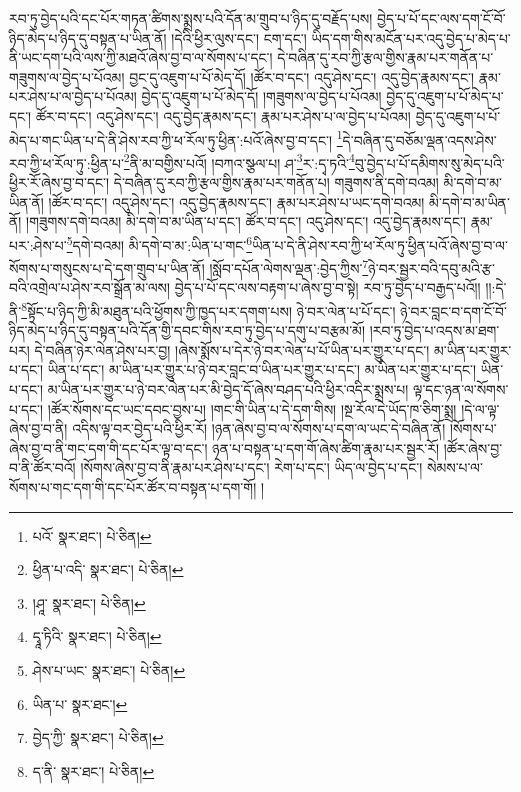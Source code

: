 རབ་ཏུ་བྱེད་པའི་དང་པོར་གཏན་ཚིགས་སྨྲས་པའི་དོན་མ་གྲུབ་པ་ཉིད་དུ་བརྗོད་པས། བྱེད་པ་པོ་དང་ལས་དག་ངོ་བོ་ཉིད་མེད་པ་ཉིད་དུ་བསྟན་པ་ཡིན་ནོ། །དེའི་ཕྱིར་ལུས་དང་། ངག་དང་། ཡིད་དག་གིས་མངོན་པར་འདུ་བྱེད་པ་མེད་པ་ནི་ཡང་དག་པའི་ལས་ཀྱི་མཐའོ་ཞེས་བྱ་བ་ལ་སོགས་པ་དང་། དེ་བཞིན་དུ་རབ་ཀྱི་རྩལ་གྱིས་རྣམ་པར་གནོན་པ་གཟུགས་ལ་བྱེད་པ་པོའམ། བྱང་དུ་འཇུག་པ་པོ་མེད་དོ། །ཚོར་བ་དང་། འདུ་ཤེས་དང་། འདུ་བྱེད་རྣམས་དང་། རྣམ་པར་ཤེས་པ་ལ་བྱེད་པ་པོའམ། བྱེད་དུ་འཇུག་པ་པོ་མེད་དོ། །གཟུགས་ལ་བྱེད་པ་པོའམ། བྱེད་དུ་འཇུག་པ་པོ་མེད་པ་དང་། ཚོར་བ་དང་། འདུ་ཤེས་དང་། འདུ་བྱེད་རྣམས་དང་། རྣམ་པར་ཤེས་པ་ལ་བྱེད་པ་པོའམ། བྱེད་དུ་འཇུག་པ་པོ་མེད་པ་གང་ཡིན་པ་དེ་ནི་ཤེས་རབ་ཀྱི་ཕ་རོལ་ཏུ་ཕྱིན་:པའོ་ཞེས་བྱ་བ་དང་། \footnote{པའོ་  སྣར་ཐང་།  པེ་ཅིན། }དེ་བཞིན་དུ་བཅོམ་ལྡན་འདས་ཤེས་རབ་ཀྱི་ཕ་རོལ་ཏུ་:ཕྱིན་པ་\footnote{ཕྱིན་པ་འདི་  སྣར་ཐང་།  པེ་ཅིན། }ནི་མ་བགྱིས་པའོ། །བཀའ་སྩལ་པ། ཤ་\footnote{།ཤཱ་  སྣར་ཐང་།  པེ་ཅིན། }ར་:དྭ་ཏའི་\footnote{དྭཱ་ཏིའི་  སྣར་ཐང་།  པེ་ཅིན། }བུ་བྱེད་པ་པོ་དམིགས་སུ་མེད་པའི་ཕྱིར་རོ་ཞེས་བྱ་བ་དང་། དེ་བཞིན་དུ་རབ་ཀྱི་རྩལ་གྱིས་རྣམ་པར་གནོན་པ། གཟུགས་ནི་དགེ་བའམ། མི་དགེ་བ་མ་ཡིན་ནོ། །ཚོར་བ་དང་། འདུ་ཤེས་དང་། འདུ་བྱེད་རྣམས་དང་། རྣམ་པར་ཤེས་པ་ཡང་དགེ་བའམ། མི་དགེ་བ་མ་ཡིན་ནོ། །གཟུགས་དགེ་བའམ། མི་དགེ་བ་མ་ཡིན་པ་དང་། ཚོར་བ་དང་། འདུ་ཤེས་དང་། འདུ་བྱེད་རྣམས་དང་། རྣམ་པར་:ཤེས་པ་\footnote{ཤེས་པ་ཡང་  སྣར་ཐང་།  པེ་ཅིན། }དགེ་བའམ། མི་དགེ་བ་མ་:ཡིན་པ་གང་\footnote{ཡིན་པ་  སྣར་ཐང་། }ཡིན་པ་དེ་ནི་ཤེས་རབ་ཀྱི་ཕ་རོལ་ཏུ་ཕྱིན་པའོ་ཞེས་བྱ་བ་ལ་སོགས་པ་གསུངས་པ་དེ་དག་གྲུབ་པ་ཡིན་ནོ། །སློབ་དཔོན་ལེགས་ལྡན་:བྱེད་ཀྱིས་\footnote{བྱེད་ཀྱི་  སྣར་ཐང་།  པེ་ཅིན། }ཉེ་བར་སྦྱར་བའི་དབུ་མའི་རྩ་བའི་འགྲེལ་པ་ཤེས་རབ་སྒྲོན་མ་ལས། བྱེད་པ་པོ་དང་ལས་བརྟག་པ་ཞེས་བྱ་བ་སྟེ། རབ་ཏུ་བྱེད་པ་བརྒྱད་པའོ།། །།:དེ་ནི་\footnote{ད་ནི་  སྣར་ཐང་།  པེ་ཅིན། }སྟོང་པ་ཉིད་ཀྱི་མི་མཐུན་པའི་ཕྱོགས་ཀྱི་ཁྱད་པར་དགག་པས། ཉེ་བར་ལེན་པ་པོ་དང་། ཉེ་བར་བླང་བ་དག་ངོ་བོ་ཉིད་མེད་པ་ཉིད་དུ་བསྟན་པའི་དོན་གྱི་དབང་གིས་རབ་ཏུ་བྱེད་པ་དགུ་པ་བརྩམ་མོ། །རབ་ཏུ་བྱེད་པ་འདས་མ་ཐག་པར། དེ་བཞིན་ཉེར་ལེན་ཤེས་པར་བྱ། །ཞེས་སྨོས་པ་དེར་ཉེ་བར་ལེན་པ་པོ་ཡིན་པར་གྱུར་པ་དང་། མ་ཡིན་པར་གྱུར་པ་དང་། ཡིན་པ་དང་། མ་ཡིན་པར་གྱུར་པ་ཉེ་བར་བླང་བ་ཡིན་པར་གྱུར་པ་དང་། མ་ཡིན་པར་གྱུར་པ་དང་། ཡིན་པ་དང་། མ་ཡིན་པར་གྱུར་པ་ཉེ་བར་ལེན་པར་མི་བྱེད་དོ་ཞེས་བཤད་པའི་ཕྱིར་འདིར་སྨྲས་པ། ལྟ་དང་ཉན་ལ་སོགས་པ་དང་། །ཚོར་སོགས་དང་ཡང་དབང་བྱས་པ། །གང་གི་ཡིན་པ་དེ་དག་གིས། །སྔ་རོལ་དེ་ཡོད་ཁ་ཅིག་སྨྲ། །དེ་ལ་ལྟ་ཞེས་བྱ་བ་ནི། འདིས་ལྟ་བར་བྱེད་པའི་ཕྱིར་རོ། །ཉན་ཞེས་བྱ་བ་ལ་སོགས་པ་དག་ལ་ཡང་དེ་བཞིན་ནོ། །སོགས་པ་ཞེས་བྱ་བ་ནི་གང་དག་གི་དང་པོར་ལྟ་བ་དང་། ཉན་པ་བསྟན་པ་དག་གོ་ཞེས་ཚིག་རྣམ་པར་སྦྱར་རོ། །ཚོར་ཞེས་བྱ་བ་ནི་ཚོར་བའོ། །སོགས་ཞེས་བྱ་བ་ནི་རྣམ་པར་ཤེས་པ་དང་། རེག་པ་དང་། ཡིད་ལ་བྱེད་པ་དང་། སེམས་པ་ལ་སོགས་པ་གང་དག་གི་དང་པོར་ཚོར་བ་བསྟན་པ་དག་གོ། །
